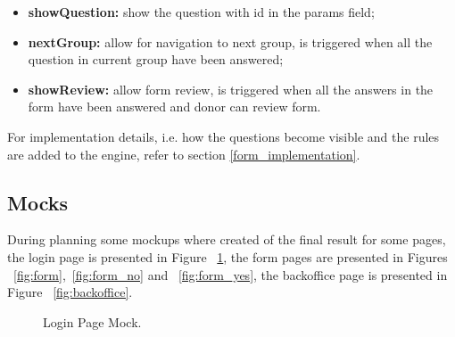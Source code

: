\begin{itemize}
	\item \textbf{showQuestion:} show the question with id in the params field;
	\item \textbf{nextGroup:} allow for navigation to next group, is triggered when all the question in current group have been answered;
	\item \textbf{showReview:} allow form review, is triggered when all the answers in the form have been answered and donor can review form.
\end{itemize}

For implementation details, i.e. how the questions become visible and the rules are added to the engine, refer to section \ref{form_implementation}.
\newpage

\subsection{Mocks}
During planning some mockups where created of the final result for some pages, the login page is presented in Figure ~\ref{fig:login}, the form pages are presented in Figures ~\ref{fig:form},~\ref{fig:form_no} and ~\ref{fig:form_yes}, the backoffice page is presented in Figure ~\ref{fig:backoffice}.

\begin{figure}[H]
	\begin{center}
	\end{center}
	\caption{Login Page Mock.}\label{fig:login}
\end{figure}

